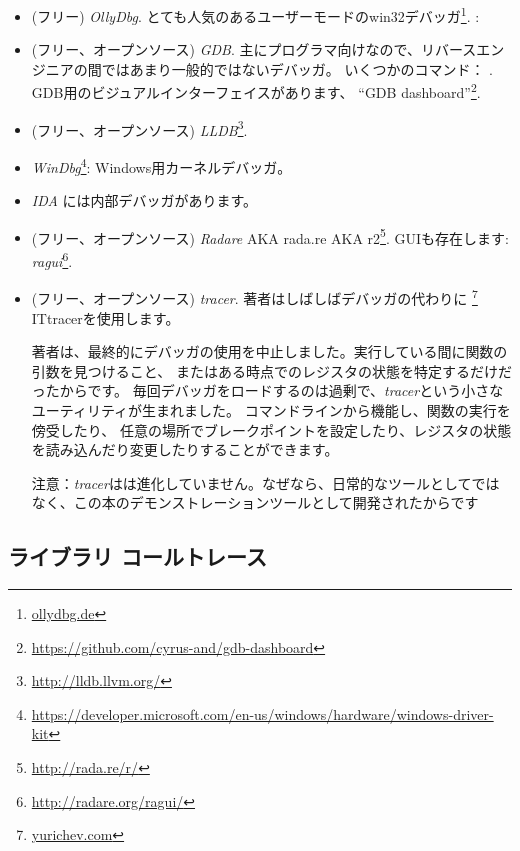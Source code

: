 \begin{itemize}
\item (フリー) \emph{OllyDbg}.
とても人気のあるユーザーモードのwin32デバッガ\footnote{\href{http://www.ollydbg.de/}{ollydbg.de}}.
\ShortHotKeyCheatsheet: 

\item (フリー、オープンソース) \emph{GDB}.
主にプログラマ向けなので、リバースエンジニアの間ではあまり一般的ではないデバッガ。
いくつかのコマンド： .
GDB用のビジュアルインターフェイスがあります、 ``GDB dashboard''\footnote{\url{https://github.com/cyrus-and/gdb-dashboard}}.

\item (フリー、オープンソース) \emph{LLDB}\footnote{\url{http://lldb.llvm.org/}}.

\item \emph{WinDbg}\footnote{\url{https://developer.microsoft.com/en-us/windows/hardware/windows-driver-kit}}:
Windows用カーネルデバッガ。

\item \emph{IDA} には内部デバッガがあります。

\item (フリー、オープンソース) \emph{Radare} \ac{AKA} rada.re \ac{AKA} r2\footnote{\url{http://rada.re/r/}}.
GUIも存在します: \emph{ragui}\footnote{\url{http://radare.org/ragui/}}.

\item (フリー、オープンソース) \emph{tracer}.
\label{tracer}
著者はしばしばデバッガの代わりに
\footnote{\href{http://yurichev.com/tracer-en.html}{yurichev.com}}
IT{tracer}を使用します。

著者は、最終的にデバッガの使用を中止しました。実行している間に関数の引数を見つけること、
またはある時点でのレジスタの状態を特定するだけだったからです。
毎回デバッガをロードするのは過剰で、\emph{tracer}という小さなユーティリティが生まれました。
コマンドラインから機能し、関数の実行を傍受したり、
任意の場所でブレークポイントを設定したり、レジスタの状態を読み込んだり変更したりすることができます。

注意：\emph{tracer}はは進化していません。なぜなら、日常的なツールとしてではなく、この本のデモンストレーションツールとして開発されたからです
\end{itemize}

\subsection{ライブラリ コールトレース}

